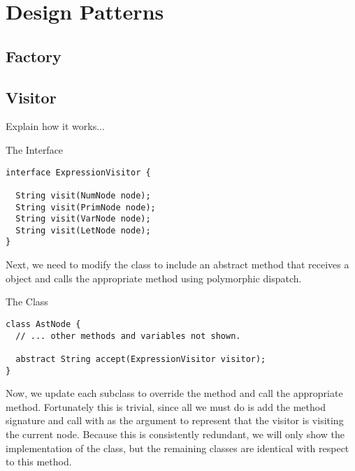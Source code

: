\section{Design Patterns}

\subsection*{Factory}

\subsection*{Visitor}

Explain how it works...


\begin{cl}{The  Interface}
\begin{lstlisting}[language=MyJava]
interface ExpressionVisitor {
  
  String visit(NumNode node);
  String visit(PrimNode node);
  String visit(VarNode node);
  String visit(LetNode node);
}
\end{lstlisting}
\end{cl}

Next, we need to modify the  class to include an abstract  method that receives a  object and calls the appropriate  method using polymorphic dispatch. 

\begin{cl}{The  Class}
\begin{lstlisting}[language=MyJava]
class AstNode {
  // ... other methods and variables not shown.

  abstract String accept(ExpressionVisitor visitor);
}
\end{lstlisting}
\end{cl}

Now, we update each subclass to override the  method and call the appropriate  method. Fortunately this is trivial, since all we must do is add the method signature and call  with  as the argument to represent that the visitor is visiting the current node. Because this is consistently redundant, we will only show the implementation of the  class, but the remaining classes are identical with respect to this method.

